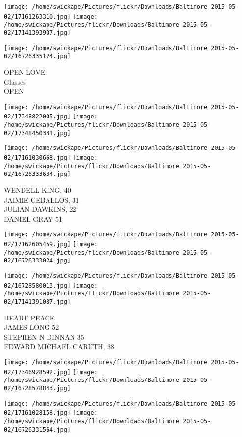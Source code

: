 \documentclass[10pt,letterpaper]{article}
\begin{document}
\texttt{[image: /home/swickape/Pictures/flickr/Downloads/Baltimore 2015-05-02/17161263310.jpg]}
\texttt{[image: /home/swickape/Pictures/flickr/Downloads/Baltimore 2015-05-02/17141393907.jpg]}

\vspace{0.25in}
\texttt{[image: /home/swickape/Pictures/flickr/Downloads/Baltimore 2015-05-02/16726335124.jpg]}

OPEN LOVE\\
Glasses\\
OPEN
\pagebreak

\texttt{[image: /home/swickape/Pictures/flickr/Downloads/Baltimore 2015-05-02/17348822005.jpg]}
\texttt{[image: /home/swickape/Pictures/flickr/Downloads/Baltimore 2015-05-02/17348450331.jpg]}

\texttt{[image: /home/swickape/Pictures/flickr/Downloads/Baltimore 2015-05-02/17161030668.jpg]}
\texttt{[image: /home/swickape/Pictures/flickr/Downloads/Baltimore 2015-05-02/16726333634.jpg]}

WENDELL KING, 40\\
JAIMIE CEBALLOS, 31\\
JULIAN DAWKINS, 22\\
DANIEL GRAY 51
\pagebreak

\texttt{[image: /home/swickape/Pictures/flickr/Downloads/Baltimore 2015-05-02/17162605459.jpg]}
\texttt{[image: /home/swickape/Pictures/flickr/Downloads/Baltimore 2015-05-02/16726333024.jpg]}

\texttt{[image: /home/swickape/Pictures/flickr/Downloads/Baltimore 2015-05-02/16728580013.jpg]}
\texttt{[image: /home/swickape/Pictures/flickr/Downloads/Baltimore 2015-05-02/17141391087.jpg]}

HEART PEACE\\
JAMES LONG 52\\
STEPHEN N DINNAN 35\\
EDWARD MICHAEL CARUTH, 38
\pagebreak

\texttt{[image: /home/swickape/Pictures/flickr/Downloads/Baltimore 2015-05-02/17346928592.jpg]}
\texttt{[image: /home/swickape/Pictures/flickr/Downloads/Baltimore 2015-05-02/16728578843.jpg]}

\texttt{[image: /home/swickape/Pictures/flickr/Downloads/Baltimore 2015-05-02/17161028158.jpg]}
\texttt{[image: /home/swickape/Pictures/flickr/Downloads/Baltimore 2015-05-02/16726331564.jpg]}
\end{document}
